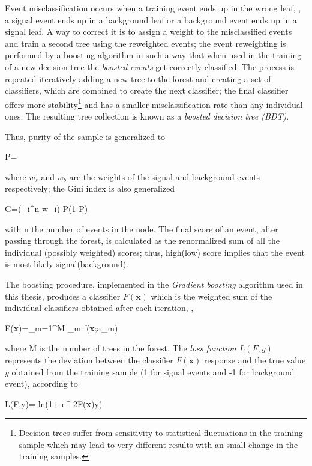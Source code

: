 Event misclassification occurs when a training event ends up in the wrong leaf, \ie, a signal event ends up in a background leaf or a background event ends up in a signal leaf. A way to correct it is to assign a weight to the misclassified events and train a second tree using the reweighted events; the event reweighting is performed by a boosting algorithm in such a way that when used in the training of a new decision tree the \textit{boosted events} get correctly classified. The process is repeated iteratively adding a new tree to the forest and creating a set of classifiers, which are combined to create the next classifier; the final classifier offers more stability\footnote{Decision trees suffer from sensitivity to statistical fluctuations in the training sample which may lead to very different results with an small change in the training samples.} and has a smaller misclassification rate than any individual ones. The resulting tree collection is known as a \textit{boosted decision tree (BDT)}.

Thus, purity of the sample is generalized to 

\beqn
P=
\eeqn

\noindent where $w_s$ and $w_b$ are the weights of the signal and background events respectively; the Gini index is also generalized

\beqn
G=\left(\sum_i^n w_i\right) P(1-P)
\eeqn

\noindent with n the number of events in the node. The final score of an event, after passing through the forest, is calculated as the renormalized sum of all the individual (possibly weighted) scores; thus, high(low) score implies that the event is most likely signal(background).   

The boosting procedure, implemented in the  \textit{Gradient boosting} algorithm used in this thesis, produces a classifier $F(\textbf{x})$ which is the weighted sum of the individual classifiers obtained after each iteration, \ie,   

\beqn
F(\textbf{x})=\sum_{m=1}^M \beta_m f(\textbf{x};a_m)
\eeqn

\noindent where M is the number of trees in the forest. The \textit{loss function $L(F,y)$} represents the deviation between the classifier $F(\textbf{x})$ response and the true value $y$ obtained from the training sample (1 for signal events and -1 for background event), according to 

\beqn
L(F,y)= \textrm{ln}(1+ e^{-2F(\textbf{x})y})
\eeqn

